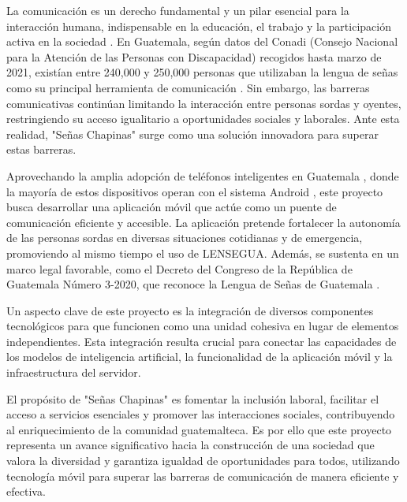 La comunicación es un derecho fundamental y un pilar esencial para la interacción humana, indispensable en la educación, el trabajo y la participación activa en la sociedad \cite{NacionesUnidas2024}. En Guatemala, según datos del Conadi (Consejo Nacional para la Atención de las Personas con Discapacidad) recogidos hasta marzo de 2021, existían entre 240,000 y 250,000 personas que utilizaban la lengua de señas como su principal herramienta de comunicación \cite{Conadi2021}. Sin embargo, las barreras comunicativas continúan limitando la interacción entre personas sordas y oyentes, restringiendo su acceso igualitario a oportunidades sociales y laborales. Ante esta realidad, "Señas Chapinas" surge como una solución innovadora para superar estas barreras.

Aprovechando la amplia adopción de teléfonos inteligentes en Guatemala \cite{Xie2023}, donde la mayoría de estos dispositivos operan con el sistema Android \cite{Xie2023}, este proyecto busca desarrollar una aplicación móvil que actúe como un puente de comunicación eficiente y accesible. La aplicación pretende fortalecer la autonomía de las personas sordas en diversas situaciones cotidianas y de emergencia, promoviendo al mismo tiempo el uso de LENSEGUA. Además, se sustenta en un marco legal favorable, como el Decreto del Congreso de la República de Guatemala Número 3-2020, que reconoce la Lengua de Señas de Guatemala \cite{CongresoGuatemala2022}.


Un aspecto clave de este proyecto es la integración de diversos componentes tecnológicos para que funcionen como una unidad cohesiva en lugar de elementos independientes. Esta integración resulta crucial para conectar las capacidades de los modelos de inteligencia artificial, la funcionalidad de la aplicación móvil y la infraestructura del servidor.

El propósito de "Señas Chapinas" es fomentar la inclusión laboral, facilitar el acceso a servicios esenciales y promover las interacciones sociales, contribuyendo al enriquecimiento de la comunidad guatemalteca.
Es por ello que este proyecto representa un avance significativo hacia la construcción de una sociedad que valora la diversidad y garantiza igualdad de oportunidades para todos, utilizando tecnología móvil para superar las barreras de comunicación de manera eficiente y efectiva.




